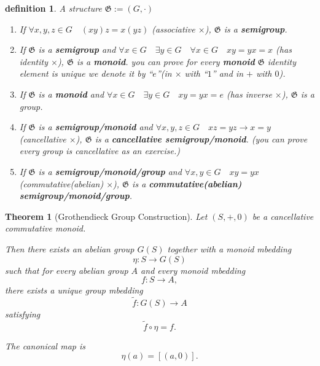 \documentclass[10pt,a4paper]{book}
\newtheorem{definition}{definition}[section]
\newtheorem{theorem}{Theorem}[section]
\begin{document}
\begin{definition}
    A structure $\mathfrak{G} := (G , \cdot) $
    \begin{enumerate}
        \setlength{\itemsep}{0pt} %
        \item       If $\forall x ,y ,z \in G \quad (x y ) z = x (y z ) $ (associative $\times$),
              $\mathfrak{G}$ is a \textbf{semigroup}.
        \item       If $\mathfrak{G}$ is a \textbf{semigroup} and $\forall x \in G \quad \exists y
                  \in G \quad \forall x \in G \quad x y = y x = x$ (has identity $\times$),
              $\mathfrak{G}$ is a \textbf{monoid}. you can prove for every \textbf{monoid}
              $\mathfrak{G}$ identity element is unique we denote it by ``$e$''(in $\times$
              with ``$1$'' and in $+$ with $0$).
        \item       If $\mathfrak{G}$ is a \textbf{monoid} and $\forall x \in G \quad \exists y \in
                  G \quad x y = y x = e$ (has inverse $\times$), $\mathfrak{G}$ is a group.
        \item       If $\mathfrak{G}$ is a \textbf{semigroup/monoid} and $\forall x , y , z \in G
                  \quad x z = y z \to x = y $ (cancellative $\times$), $\mathfrak{G}$ is a
              \textbf{cancellative semigroup/monoid}. (you can prove every group is
              cancellative as an exercise.)
        \item       If $\mathfrak{G}$ is a \textbf{semigroup/monoid/group} and $\forall x ,y \in G
                  \quad x y = y x $ (commutative(abelian) $\times$), $\mathfrak{G}$ is a
              \textbf{commutative(abelian) semigroup/monoid/group}.

    \end{enumerate}

\end{definition}

\begin{theorem}[Grothendieck Group Construction]
    Let $(S,+,0)$ be a cancellative commutative monoid.

    Then there exists an abelian group $G(S)$ together with a monoid mbedding
    \[
        \eta : S \longrightarrow G(S)
    \]
    such that for every abelian group $A$ and every monoid mbedding
    \[
        f : S \to A,
    \]
    there exists a unique group mbedding
    \[
        \tilde{f} : G(S) \to A
    \]
    satisfying
    \[
        \tilde{f} \circ \eta = f.
    \]

    The canonical map is
    \[
        \eta(a) = [(a,0)].
    \]
\end{theorem}
\end{document}

